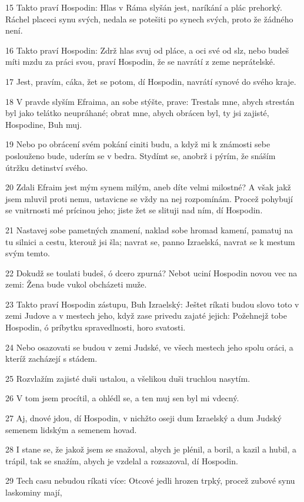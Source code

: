 \par 15 Takto praví Hospodin: Hlas v Ráma slyšán jest, naríkání a plác prehorký. Ráchel placeci synu svých, nedala se potešiti po synech svých, proto že žádného není.
\par 16 Takto praví Hospodin: Zdrž hlas svuj od pláce, a oci své od slz, nebo budeš míti mzdu za práci svou, praví Hospodin, že se navrátí z zeme neprátelské.
\par 17 Jest, pravím, cáka, žet se potom, dí Hospodin, navrátí synové do svého kraje.
\par 18 V pravde slyším Efraima, an sobe stýšte, prave: Trestals mne, abych strestán byl jako telátko neupráhané; obrat mne, abych obrácen byl, ty jsi zajisté, Hospodine, Buh muj.
\par 19 Nebo po obrácení svém pokání ciniti budu, a když mi k známosti sebe poslouženo bude, uderím se v bedra. Stydímt se, anobrž i pýrím, že snáším útržku detinství svého.
\par 20 Zdali Efraim jest mým synem milým, aneb díte velmi milostné? A však jakž jsem mluvil proti nemu, ustavicne se vždy na nej rozpomínám. Procež pohybují se vnitrnosti mé prícinou jeho; jiste žet se slituji nad ním, dí Hospodin.
\par 21 Nastavej sobe pametných znamení, naklad sobe hromad kamení, pamatuj na tu silnici a cestu, kterouž jsi šla; navrat se, panno Izraelská, navrat se k mestum svým temto.
\par 22 Dokudž se toulati budeš, ó dcero zpurná? Nebot uciní Hospodin novou vec na zemi: Žena bude vukol obcházeti muže.
\par 23 Takto praví Hospodin zástupu, Buh Izraelský: Ještet ríkati budou slovo toto v zemi Judove a v mestech jeho, když zase privedu zajaté jejich: Požehnejž tobe Hospodin, ó príbytku spravedlnosti, horo svatosti.
\par 24 Nebo osazovati se budou v zemi Judské, ve všech mestech jeho spolu oráci, a kteríž zacházejí s stádem.
\par 25 Rozvlažím zajisté duši ustalou, a všelikou duši truchlou nasytím.
\par 26 V tom jsem procítil, a ohlédl se, a ten muj sen byl mi vdecný.
\par 27 Aj, dnové jdou, dí Hospodin, v nichžto oseji dum Izraelský a dum Judský semenem lidským a semenem hovad.
\par 28 I stane se, že jakož jsem se snažoval, abych je plénil, a boril, a kazil a hubil, a trápil, tak se snažím, abych je vzdelal a rozsazoval, dí Hospodin.
\par 29 Tech casu nebudou ríkati více: Otcové jedli hrozen trpký, procež zubové synu laskominy mají,
